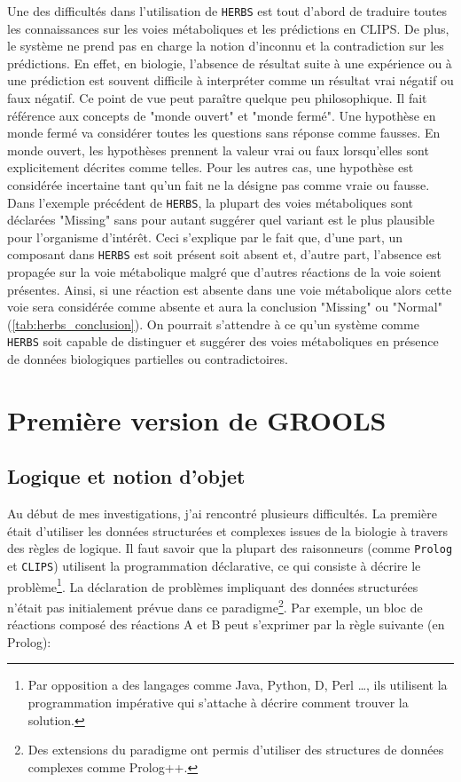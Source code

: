 \begin{refsegment}
Une des difficultés dans l’utilisation de \texttt{\gls{HERBS}} est tout d’abord de traduire toutes les connaissances sur les voies métaboliques et les prédictions en CLIPS. De plus, le système ne prend pas en charge la notion d’inconnu et la contradiction sur les prédictions. En effet, en biologie, l’absence de résultat suite à une expérience ou à une prédiction est souvent difficile à interpréter comme un résultat vrai négatif ou faux négatif. Ce point de vue peut paraître quelque peu philosophique. Il fait référence aux concepts de "monde ouvert" et "monde fermé". Une hypothèse en monde fermé va considérer toutes les questions sans réponse comme fausses. En monde ouvert, les hypothèses prennent la valeur vrai ou faux lorsqu'elles sont explicitement décrites comme telles. Pour les autres cas, une hypothèse est considérée incertaine tant qu'un fait ne la désigne pas comme vraie ou fausse. Dans l’exemple précédent de \texttt{\gls{HERBS}}, la plupart des voies métaboliques sont déclarées "Missing" sans pour autant suggérer quel variant est le plus plausible pour l'organisme d'intérêt. Ceci s'explique par le fait que, d'une part, un composant dans \texttt{\gls{HERBS}} est soit présent soit absent et, d'autre part, l'absence est propagée sur la voie métabolique malgré que d’autres réactions de la voie soient présentes. Ainsi, si une réaction est absente dans une voie métabolique alors cette voie sera considérée comme absente et aura la conclusion "Missing" ou "Normal" (\cref{tab:herbs_conclusion}). On pourrait s’attendre à ce qu'un système comme \texttt{\gls{HERBS}} soit capable de distinguer et suggérer des voies métaboliques en présence de données biologiques partielles ou contradictoires. 

\section{Première version de GROOLS}

\subsection{Logique et notion d'objet}

Au début de mes investigations, j'ai rencontré plusieurs difficultés. La première était d'utiliser les données structurées et complexes issues de la biologie à travers des règles de logique. Il faut savoir que la plupart des raisonneurs (comme \texttt{Prolog} et \texttt{CLIPS}) utilisent la programmation déclarative, ce qui consiste à décrire le problème\footnote{Par opposition a des langages comme Java, Python, D, Perl \ldots, ils utilisent la programmation impérative qui s'attache à décrire comment trouver la solution.}. La déclaration de problèmes impliquant des données structurées n'était pas initialement prévue dans ce paradigme\footnote{Des extensions du paradigme ont permis d'utiliser des structures de données complexes comme Prolog++.}. Par exemple, un bloc de réactions composé  des réactions A et B peut s'exprimer par la règle suivante (en Prolog):


\end{refsegment}
